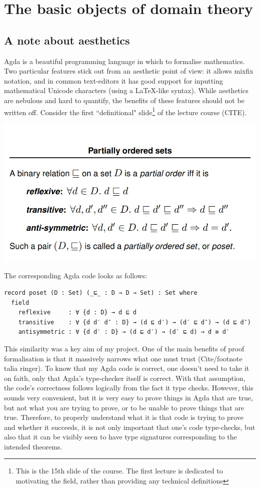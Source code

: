 \documentclass[12pt,a4paper,twoside,openright]{report}
\begin{document}
\section{The basic objects of domain theory}
\subsection{A note about aesthetics}
Agda is a beautiful programming language in which to formalise mathematics. Two particular features stick out from an aesthetic point of view: it allows mixfix notation, and in common text-editors it has good support for inputting mathematical Unicode characters (using a \LaTeX-like syntax). While aesthetics are nebulous and hard to quantify, the benefits of these features should not be written off. Consider the first ``definitional" slide\footnote{This is the 15th slide of the course. The first lecture is dedicated to motivating the field, rather than providing any technical definitions} of the lecture course (CITE).
\begin{center}
\includegraphics[scale = 0.7]{figs/poset_def}
\end{center}

The corresponding Agda code looks as follows:
\begin{verbatim}
record poset (D : Set) (_⊑_ : D → D → Set) : Set where
  field
    reflexive     : ∀ {d : D} → d ⊑ d 
    transitive    : ∀ {d d′ d″ : D} → (d ⊑ d′) → (d′ ⊑ d″) → (d ⊑ d″)
    antisymmetric : ∀ {d d′ : D} → (d ⊑ d′) → (d′ ⊑ d) → d ≡ d′
\end{verbatim}
This similarity was a key aim of my project. One of the main benefits of proof formalisation is that it massively narrows what one must trust (Cite/footnote talia ringer). To know that my Agda code is correct, one doesn't need to take it on faith, only that Agda's type-checker itself is correct. With that assumption, the code's correctness follows logically from the fact it type checks. However, this sounds very convenient, but it is very easy to prove things in Agda that are true, but not what you are trying to prove, or to be unable to prove things that are true. Therefore, to properly understand what it is that code is trying to prove and whether it succeeds, it is not only important that one's code type-checks, but also that it can be visibly seen to have type signatures corresponding to the intended theorems. 
\end{document}
